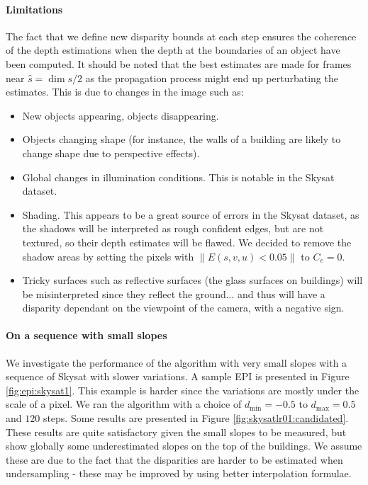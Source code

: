 \documentclass{article}
\newcommand{\norm}[1]{\left\lVert#1\right\rVert}
\theoremstyle{definition}
\begin{document}
\paragraph{Limitations} The fact that we define new disparity bounds at each step ensures the coherence of the depth estimations when the depth at the boundaries of an object have been computed. It should be noted that the best estimates are made for frames near $\widehat{s} = \dim s / 2$ as the propagation process might end up perturbating the estimates. This is due to changes in the image such as:
\begin{itemize}
 \item New objects appearing, objects disappearing.
 \item Objects changing shape (for instance, the walls of a building are likely to change shape due to perspective effects).
 \item Global changes in illumination conditions. This is notable in the Skysat dataset.
 \item Shading. This appears to be a great source of errors in the Skysat dataset, as the shadows will be interpreted as rough confident edges, but are not textured, so their depth estimates will be flawed. We decided to remove the shadow areas by setting the pixels with $\norm{E(s, v, u) < 0.05}$ to $C_e = 0$.
 \item Tricky surfaces such as reflective surfaces (the glass surfaces on buildings) will be misinterpreted since they reflect the ground... and thus will have a disparity dependant on the viewpoint of the camera, with a negative sign.
\end{itemize}


\paragraph{On a sequence with small slopes}


We investigate the performance of the algorithm with very small slopes with a sequence of Skysat with slower variations. A sample EPI is presented in Figure \ref{fig:epi:skysat1}. This example is harder since the variations are mostly under the scale of a pixel. We ran the algorithm with a choice of $d_{\min} = -0.5$ to $d_{\max} = 0.5$ and $120$ steps. Some results are presented in Figure \ref{fig:skysatlr01:candidated}. These results are quite satisfactory given the small slopes to be measured, but show globally some underestimated slopes on the top of the buildings. We assume these are due to the fact that the disparities are harder to be estimated when undersampling - these may be improved by using better interpolation formulae.
\end{document}
